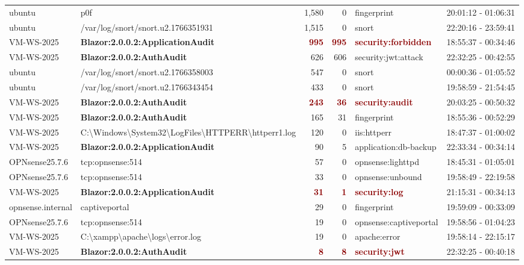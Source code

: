 \begin{table}[hbtp]
\begin{tabular}{|l|l|r|r|l|l|}
ubuntu & p0f & 1,580 & 0 & fingerprint & 20:01:12 - 01:06:31 \\
ubuntu & /var/log/snort/snort.u2.1766351931 & 1,515 & 0 & snort & 22:20:16 - 23:59:41 \\
VM-WS-2025 & \textbf{Blazor:2.0.0.2:ApplicationAudit} & \textcolor{darkred}{\textbf{995}} & \textcolor{darkred}{\textbf{995}} & \textcolor{darkred}{\textbf{security:forbidden}} & 18:55:37 - 00:34:46 \\
VM-WS-2025 & \textbf{Blazor:2.0.0.2:AuthAudit} & 626 & 606 & security:jwt:attack & 22:32:25 - 00:42:55 \\
ubuntu & /var/log/snort/snort.u2.1766358003 & 547 & 0 & snort & 00:00:36 - 01:05:52 \\
ubuntu & /var/log/snort/snort.u2.1766343454 & 433 & 0 & snort & 19:58:59 - 21:54:45 \\
VM-WS-2025 & \textbf{Blazor:2.0.0.2:AuthAudit} & \textcolor{darkred}{\textbf{243}} & \textcolor{darkred}{\textbf{36}} & \textcolor{darkred}{\textbf{security:audit}} & 20:03:25 - 00:50:32 \\
VM-WS-2025 & \textbf{Blazor:2.0.0.2:AuthAudit} & 165 & 31 & fingerprint & 18:55:36 - 00:52:29 \\
VM-WS-2025 & C:\textbackslash{}Windows\textbackslash{}System32\textbackslash{}LogFiles\textbackslash{}HTTPERR\textbackslash{}httperr1.log & 120 & 0 & iis:httperr & 18:47:37 - 01:00:02 \\
VM-WS-2025 & \textbf{Blazor:2.0.0.2:ApplicationAudit} & 90 & 5 & application:db-backup & 22:33:34 - 00:34:14 \\
OPNsense25.7.6 & tcp:opnsense:514 & 57 & 0 & opnsense:lighttpd & 18:45:31 - 01:05:01 \\
OPNsense25.7.6 & tcp:opnsense:514 & 33 & 0 & opnsense:unbound & 19:58:49 - 22:19:58 \\
VM-WS-2025 & \textbf{Blazor:2.0.0.2:ApplicationAudit} & \textcolor{darkred}{\textbf{31}} & \textcolor{darkred}{\textbf{1}} & \textcolor{darkred}{\textbf{security:log}} & 21:15:31 - 00:34:13 \\
opnsense.internal & captiveportal & 29 & 0 & fingerprint & 19:59:09 - 00:33:09 \\
OPNsense25.7.6 & tcp:opnsense:514 & 19 & 0 & opnsense:captiveportal & 19:58:56 - 01:04:23 \\
VM-WS-2025 & C:\textbackslash{}xampp\textbackslash{}apache\textbackslash{}logs\textbackslash{}error.log & 19 & 0 & apache:error & 19:58:14 - 22:15:17 \\
VM-WS-2025 & \textbf{Blazor:2.0.0.2:AuthAudit} & \textcolor{darkred}{\textbf{8}} & \textcolor{darkred}{\textbf{8}} & \textcolor{darkred}{\textbf{security:jwt}} & 22:32:25 - 00:40:18 \\

\end{tabular}
\end{table}
